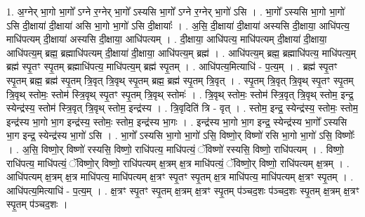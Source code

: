 \documentclass[17pt]{extarticle}
\begin{document}
1. अ॒ग्नेर् भा॒गो भा॒गो᳚ ऽग्ने र॒ग्नेर् भा॒गो᳚ ऽस्यसि भा॒गो᳚ ऽग्ने र॒ग्नेर् भा॒गो॑ ऽसि । . भा॒गो᳚ ऽस्यसि भा॒गो भा॒गो॑ ऽसि दी॒क्षाया॑ दी॒क्षाया॑ असि भा॒गो भा॒गो॑ ऽसि दी॒क्षायाः᳚ । . अ॒सि॒ दी॒क्षाया॑ दी॒क्षाया॑ अस्यसि दी॒क्षाया॒ आधि॑पत्य॒ माधि॑पत्यम् दी॒क्षाया॑ अस्यसि दी॒क्षाया॒ आधि॑पत्यम् । . दी॒क्षाया॒ आधि॑पत्य॒ माधि॑पत्यम् दी॒क्षाया॑ दी॒क्षाया॒ आधि॑पत्य॒म् ब्रह्म॒ ब्रह्माधि॑पत्यम् दी॒क्षाया॑ दी॒क्षाया॒ आधि॑पत्य॒म् ब्रह्म॑ । . आधि॑पत्य॒म् ब्रह्म॒ ब्रह्माधि॑पत्य॒ माधि॑पत्य॒म् ब्रह्म॑ स्पृ॒तꣳ स्पृ॒तम् ब्रह्माधि॑पत्य॒ माधि॑पत्य॒म् 
ब्रह्म॑ स्पृ॒तम् । . आधि॑पत्य॒मित्याधि॑ - प॒त्य॒म् । . ब्रह्म॑ स्पृ॒तꣳ स्पृ॒तम् ब्रह्म॒ ब्रह्म॑ स्पृ॒तम् त्रि॒वृत् त्रि॒वृथ् स्पृ॒तम् ब्रह्म॒ ब्रह्म॑ स्पृ॒तम् त्रि॒वृत् । . स्पृ॒तम् त्रि॒वृत् त्रि॒वृथ् स्पृ॒तꣳ स्पृ॒तम् त्रि॒वृथ् स्तोमः॒ स्तोम॑ स्त्रि॒वृथ् स्पृ॒तꣳ स्पृ॒तम् त्रि॒वृथ् स्तोमः॑ । . त्रि॒वृथ् स्तोमः॒ स्तोम॑ स्त्रि॒वृत् त्रि॒वृथ् स्तोम॒ इन्द्र॒ स्येन्द्र॑स्य॒ स्तोम॑ स्त्रि॒वृत् त्रि॒वृथ् स्तोम॒ इन्द्र॑स्य । . त्रि॒वृदिति॑ त्रि - वृत् । . स्तोम॒ इन्द्र॒ स्येन्द्र॑स्य॒ स्तोमः॒ स्तोम॒ इन्द्र॑स्य भा॒गो भा॒ग इन्द्र॑स्य॒ स्तोमः॒ स्तोम॒ इन्द्र॑स्य भा॒गः । . इन्द्र॑स्य भा॒गो भा॒ग इन्द्र॒ स्येन्द्र॑स्य भा॒गो᳚ ऽस्यसि भा॒ग इन्द्र॒ स्येन्द्र॑स्य भा॒गो॑ ऽसि । . भा॒गो᳚ ऽस्यसि भा॒गो भा॒गो॑ ऽसि॒ विष्णो॒र् विष्णो॑ रसि भा॒गो भा॒गो॑ ऽसि॒ विष्णोः᳚ । . अ॒सि॒ विष्णो॒र् विष्णो॑ रस्यसि॒ विष्णो॒ राधि॑पत्य॒ माधि॑पत्यं॒ ॅविष्णो॑ रस्यसि॒ विष्णो॒ राधि॑पत्यम् । . विष्णो॒ राधि॑पत्य॒ माधि॑पत्यं॒ ॅविष्णो॒र् विष्णो॒ राधि॑पत्यम् क्ष॒त्रम् क्ष॒त्र माधि॑पत्यं॒ ॅविष्णो॒र् विष्णो॒ राधि॑पत्यम् क्ष॒त्रम् । . आधि॑पत्यम् क्ष॒त्रम् क्ष॒त्र माधि॑पत्य॒ माधि॑पत्यम् क्ष॒त्रꣳ स्पृ॒तꣳ स्पृ॒तम् क्ष॒त्र माधि॑पत्य॒ माधि॑पत्यम् क्ष॒त्रꣳ स्पृ॒तम् । . आधि॑पत्य॒मित्याधि॑ - प॒त्य॒म् । . क्ष॒त्रꣳ स्पृ॒तꣳ स्पृ॒तम् क्ष॒त्रम् क्ष॒त्रꣳ स्पृ॒तम् प॑ञ्चद॒शः प॑ञ्चद॒शः स्पृ॒तम् क्ष॒त्रम् क्ष॒त्रꣳ स्पृ॒तम् प॑ञ्चद॒शः । \newline
\end{document}
